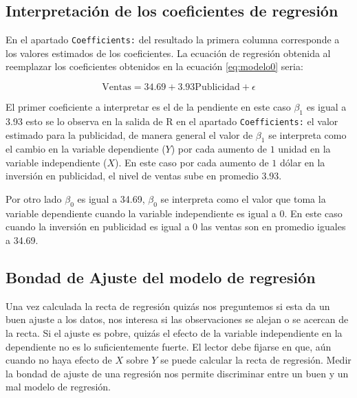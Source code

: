 \documentclass[letterpaper,]{book}
\begin{document}
\hypertarget{coefregre}{%
\subsection{Interpretación de los coeficientes de regresión}\label{coefregre}}

En el apartado \texttt{Coefficients:} del resultado la primera columna corresponde a los valores estimados de los coeficientes. La ecuación de regresión obtenida al reemplazar los coeficientes obtenidos en la ecuación \eqref{eq:modelo0} seria:

\begin{equation}
\text{Ventas} = 34.69 + 3.93\text{Publicidad} + \epsilon 
    \label{eq:modelo}
\end{equation}

El primer coeficiente a interpretar es el de la pendiente en este caso \(\beta_1\) es igual a 3.93 esto se lo observa en la salida de R en el apartado \texttt{Coefficients:} el valor estimado para la publicidad, de manera general el valor de \(\beta_1\) se interpreta como el cambio en la variable dependiente (\(Y\)) por cada aumento de \(1\) unidad en la variable independiente (\(X\)). En este caso por cada aumento de \(1\) dólar en la inversión en publicidad, el nivel de ventas sube en promedio 3.93.

Por otro lado \(\beta_0\) es igual a 34.69, \(\beta_0\) se interpreta como el valor que toma la variable dependiente cuando la variable independiente es igual a \(0\). En este caso cuando la inversión en publicidad es igual a \(0\) las ventas son en promedio iguales a 34.69.

\hypertarget{bondad-de-ajuste-del-modelo-de-regresion}{%
\subsection{Bondad de Ajuste del modelo de regresión}\label{bondad-de-ajuste-del-modelo-de-regresion}}

Una vez calculada la recta de regresión quizás nos preguntemos si esta da un buen ajuste a los datos, nos interesa si las observaciones se alejan o se acercan de la recta. Si el ajuste es pobre, quizás el efecto de la variable independiente en la dependiente no es lo suficientemente fuerte. El lector debe fijarse en que, aún cuando no haya efecto de \(X\) sobre \(Y\) se puede calcular la recta de regresión. Medir la bondad de ajuste de una regresión nos permite discriminar entre un buen y un mal modelo de regresión.
\end{document}
